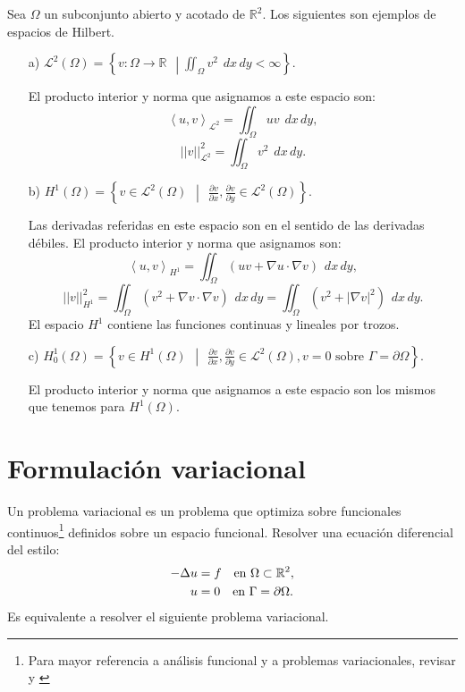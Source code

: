 \documentclass[12pt,spanish,oneside]{book}
\theoremstyle{plain}
\numberwithin{equation}{chapter}
\theoremstyle{definition}
\theoremstyle{remark}
\newcommand{\re}{\mathbb{R}}
\newcommand{\parc}[2]{\frac{\partial #1}{\partial #2}}
\newcommand{\LD}{\mathcal{L}^2}
\newcommand{\hu}{H^1}
\newcommand{\hcu}{H_0^1}
\newcommand{\dxy}{\hspace{5pt} dx\hspace{2pt} dy }
\newcommand{\intomega}[1]{\iint_\Omega #1 \dxy} %
\begin{document}
Sea $\Omega$ un subconjunto abierto y acotado de $\re^2$. Los siguientes son ejemplos de espacios de Hilbert.
\begin{enumerate}
\item[a)] $\LD(\Omega)=\left \lbrace v:\Omega\rightarrow \re \hspace{5pt} \middle| \displaystyle\iint_\Omega v^2\dxy<\infty\right \rbrace$.

El producto interior y norma que asignamos a este espacio son:
\[\left<u,v\right>_{\LD}=\displaystyle\iint_\Omega u v\dxy,\]
\[||v||^2_{\LD}=\iint_\Omega	v^2\dxy.\]
\item[b)] $\hu (\Omega)= \left \lbrace v \in \LD(\Omega) \hspace{5pt}\middle|\hspace{5pt} \displaystyle\parc{v}{x},\parc{v}{y} \in \LD(\Omega) \right \rbrace$.

Las derivadas referidas en este espacio son en el sentido de las derivadas débiles. El producto interior y norma que asignamos son:
\[ \left<u,v\right>_{\hu}=\intomega{\left(uv + \nabla u \cdot \nabla v\right)},\]
\[||v||^2_{\hu}=\intomega{\left(v^2 + \nabla v \cdot \nabla v\right)}=\intomega{\left(v^2 + |\nabla v|^2\right)}.\]
El espacio $\hu$ contiene las funciones continuas y lineales por trozos.
\item[c)] $\hcu(\Omega) = \left\lbrace v \in \hu(\Omega) \hspace{5pt}\middle|\hspace{5pt} \displaystyle\parc{v}{x},\parc{v}{y} \in \LD(\Omega),v=0 \text{ sobre } \Gamma=\partial\Omega\right \rbrace.$

El producto interior y norma que asignamos a este espacio son los mismos que tenemos para $\hu(\Omega)$. 
\end{enumerate}


\section{Formulación variacional}

Un problema variacional es un problema que optimiza sobre funcionales continuos\footnote{Para mayor referencia a análisis funcional y a problemas variacionales, revisar \cite{funcional1} y \cite{funcional2}} definidos sobre un espacio funcional.
Resolver una ecuación diferencial del estilo: 
\begin{align}\label{1.11}
-\Delta u &= f \hspace{10 pt} \text{en } \Omega \subset \re^2 , \\
u &=0 \hspace{10 pt} \text{en } \Gamma=\partial\Omega.\nonumber
\end{align}
Es equivalente a resolver el siguiente problema variacional.
\end{document}
